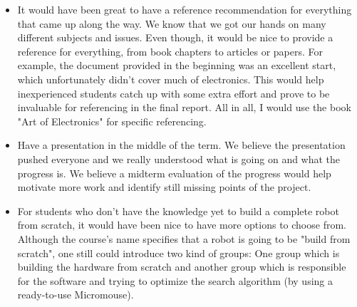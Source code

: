\begin{itemize}
    \item It would have been great to have a reference recommendation for everything that came up along the way. We know that we got our hands on many different subjects and issues. Even though, it would be nice to provide a reference for everything, from book chapters to articles or papers. For example, the document provided in the beginning was an excellent start, which unfortunately didn't cover much of electronics. This would help inexperienced students catch up with some extra effort and prove to be invaluable for referencing in the final report. All in all, I would use the book "Art of Electronics" for specific referencing.
    \item Have a presentation in the middle of the term. We believe the presentation pushed everyone and we really understood what is going on and what the progress is. We believe a midterm evaluation of the progress would help motivate more work and identify still missing points of the project.
    \item For students who don't have the knowledge yet to build a complete robot from scratch, it would have been nice to have more options to choose from. Although the course's name specifies that a robot is going to be "build from scratch", one still could introduce two kind of groups: One group which is building the hardware from scratch and another group which is responsible for the software and trying to optimize the search algorithm (by using a ready-to-use Micromouse).
\end{itemize}